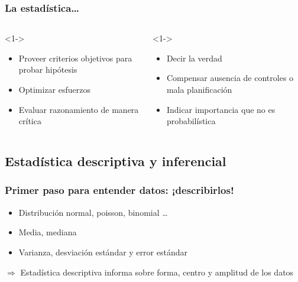 \documentclass[mathserif]{beamer}
\begin{document}
\begin{frame}[label=can-not]
   \frametitle{La estad\'istica\ldots}
   \begin{columns}[t, totalwidth=10cm]
   \begin{column}[]{4.8cm}
     \begin{block}{}<1->
     \begin{itemize}[<1-| uncover@+| handout:1>]
       \item Proveer criterios objetivos para probar hip\'otesis
       \item Optimizar esfuerzos
       \item Evaluar razonamiento de manera cr\'itica
     \end{itemize}
     \end{block}
   \end{column}
   \begin{column}[]{4.8cm}
   \begin{block}{}<1->
     \begin{itemize}[<1-| uncover@+| handout:1>]
       \item Decir la verdad
       \item Compensar ausencia de controles o mala planificaci\'on
       \item Indicar importancia que no es probabil\'istica
     \end{itemize}
   \end{block}
   \end{column}
     \end{columns}
\end{frame}%


\subsection[Descriptiva / inferencial]{Estad\'istica descriptiva y inferencial}

\begin{frame}[label=desc]
\frametitle{Primer paso para entender datos: ¡describirlos!}
 \begin{itemize}
   \item Distribuci\'on normal, poisson, binomial \ldots
   \item Media, mediana
   \item Varianza, desviaci\'on est\'andar y error est\'andar
 \end{itemize}
 \medskip
 \hspace{1em} $\Rightarrow$ Estad\'istica \alert{descriptiva} informa sobre forma, centro y amplitud de los datos
\end{frame}%
\end{document}
